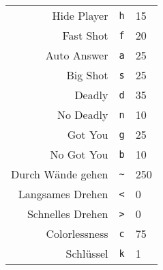 \documentclass[12pt,twoside]{article}
\begin{document}
\begin{center}
\begin{tabular}{|r|c|l|}
Hide Player & \verb|h| & 15\\

Fast Shot & \verb|f| & 20\\

Auto Answer & \verb|a| & 25\\

Big Shot & \verb|s| & 25\\

Deadly & \verb|d| & 35\\

No Deadly & \verb|n| & 10\\

Got You & \verb|g| & 25\\

No Got You & \verb|b| & 10\\

Durch W\"ande gehen & \verb|~| & 250\\

Langsames Drehen & \verb|<| & 0\\

Schnelles Drehen & \verb|>| & 0\\

Colorlessness & \verb|c| & 75\\

Schl\"ussel & \verb|k| & 1\\

\hline

\end{tabular}

\end{center}
\end{document}
